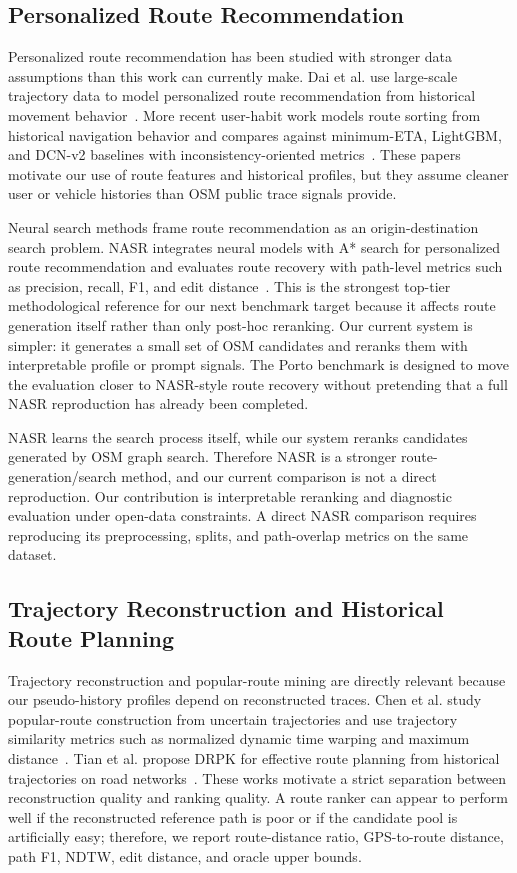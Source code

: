 \subsection{Personalized Route Recommendation}
Personalized route recommendation has been studied with stronger data assumptions than this work can currently make. Dai et al. use large-scale trajectory data to model personalized route recommendation from historical movement behavior~\cite{dai2015bigtrajectory}. More recent user-habit work models route sorting from historical navigation behavior and compares against minimum-ETA, LightGBM, and DCN-v2 baselines with inconsistency-oriented metrics~\cite{userhabits2024}. These papers motivate our use of route features and historical profiles, but they assume cleaner user or vehicle histories than OSM public trace signals provide.

Neural search methods frame route recommendation as an origin-destination search problem. NASR integrates neural models with A* search for personalized route recommendation and evaluates route recovery with path-level metrics such as precision, recall, F1, and edit distance~\cite{nasr2019}. This is the strongest top-tier methodological reference for our next benchmark target because it affects route generation itself rather than only post-hoc reranking. Our current system is simpler: it generates a small set of OSM candidates and reranks them with interpretable profile or prompt signals. The Porto benchmark is designed to move the evaluation closer to NASR-style route recovery without pretending that a full NASR reproduction has already been completed.

NASR learns the search process itself, while our system reranks candidates generated by OSM graph search. Therefore NASR is a stronger route-generation/search method, and our current comparison is not a direct reproduction. Our contribution is interpretable reranking and diagnostic evaluation under open-data constraints. A direct NASR comparison requires reproducing its preprocessing, splits, and path-overlap metrics on the same dataset.

\subsection{Trajectory Reconstruction and Historical Route Planning}
Trajectory reconstruction and popular-route mining are directly relevant because our pseudo-history profiles depend on reconstructed traces. Chen et al. study popular-route construction from uncertain trajectories and use trajectory similarity metrics such as normalized dynamic time warping and maximum distance~\cite{chen2012popular}. Tian et al. propose DRPK for effective route planning from historical trajectories on road networks~\cite{tian2023drpk}. These works motivate a strict separation between reconstruction quality and ranking quality. A route ranker can appear to perform well if the reconstructed reference path is poor or if the candidate pool is artificially easy; therefore, we report route-distance ratio, GPS-to-route distance, path F1, NDTW, edit distance, and oracle upper bounds.

